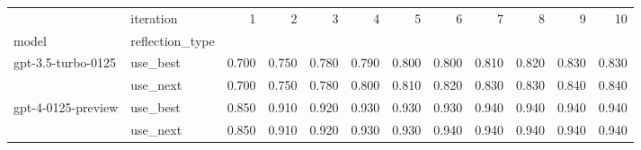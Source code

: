 \begin{tabular}{llrrrrrrrrrr}
\toprule
 & iteration & 1 & 2 & 3 & 4 & 5 & 6 & 7 & 8 & 9 & 10 \\
model & reflection_type &  &  &  &  &  &  &  &  &  &  \\
\midrule
\multirow[t]{2}{*}{gpt-3.5-turbo-0125} & use_best & 0.700 & 0.750 & 0.780 & 0.790 & 0.800 & 0.800 & 0.810 & 0.820 & 0.830 & 0.830 \\
 & use_next & 0.700 & 0.750 & 0.780 & 0.800 & 0.810 & 0.820 & 0.830 & 0.830 & 0.840 & 0.840 \\
\cline{1-12}
\multirow[t]{2}{*}{gpt-4-0125-preview} & use_best & 0.850 & 0.910 & 0.920 & 0.930 & 0.930 & 0.930 & 0.940 & 0.940 & 0.940 & 0.940 \\
 & use_next & 0.850 & 0.910 & 0.920 & 0.930 & 0.930 & 0.940 & 0.940 & 0.940 & 0.940 & 0.940 \\
\cline{1-12}
\bottomrule
\end{tabular}
